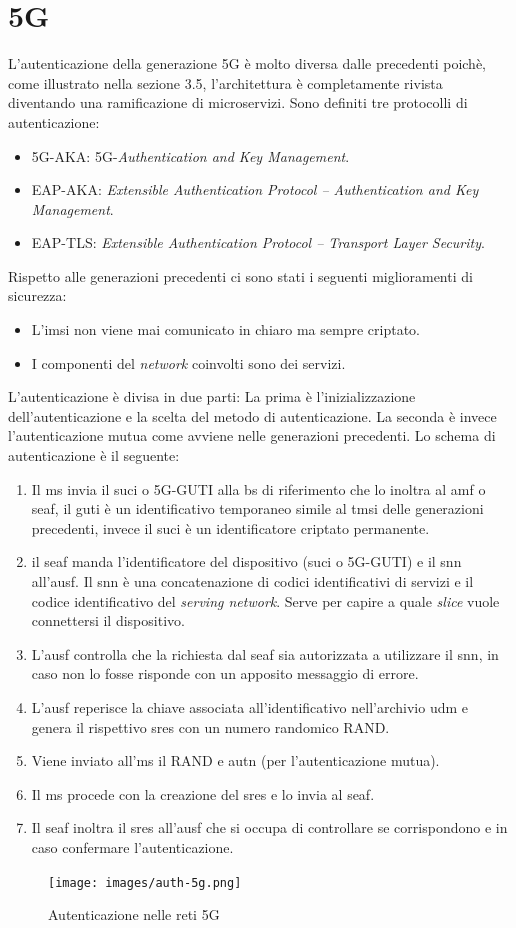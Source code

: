 \clearpage

\section{5G}
L'autenticazione della generazione 5G è molto diversa dalle precedenti poichè, come illustrato nella sezione 3.5, l'architettura è completamente rivista diventando una ramificazione di microservizi.
Sono definiti tre protocolli di autenticazione:
\begin{itemize}
    \item 5G-AKA: 5G-\textit{Authentication and Key Management}.
    \item EAP-AKA: \textit{Extensible Authentication Protocol – Authentication and Key Management}.
    \item EAP-TLS: \textit{Extensible Authentication Protocol – Transport Layer Security}.
\end{itemize}
Rispetto alle generazioni precedenti ci sono stati i seguenti miglioramenti di sicurezza\cite{5g-vs-4g}:
\begin{itemize}
    \item L'\gls{imsi} non viene mai comunicato in chiaro ma sempre criptato.
    \item I componenti del \textit{network} coinvolti sono dei servizi.
\end{itemize}
L'autenticazione è divisa in due parti: La prima è l'inizializzazione dell'autenticazione e la scelta del metodo di autenticazione.
La seconda è invece l'autenticazione mutua come avviene nelle generazioni precedenti.
Lo schema di autenticazione è il seguente\cite{5g-auth}:
\begin{enumerate}
    \item Il \gls{ms} invia il \gls{suci} o 5G-GUTI alla \gls{bs} di riferimento che lo inoltra al \gls{amf} o \gls{seaf},
    il \gls{guti} è un identificativo temporaneo simile al \gls{tmsi} delle generazioni precedenti, invece il \gls{suci} è un identificatore criptato
    permanente.
    \item il \gls{seaf} manda l'identificatore del dispositivo (\gls{suci} o 5G-GUTI) e il \gls{snn} all'\gls{ausf}.
    Il \gls{snn} è una concatenazione di codici identificativi di servizi e il codice identificativo del \textit{serving network}. Serve per capire 
    a quale \textit{slice} vuole connettersi il dispositivo.
    \item L'\gls{ausf} controlla che la richiesta dal \gls{seaf} sia autorizzata a utilizzare il \gls{snn}, in caso non lo fosse risponde con un 
    apposito messaggio di errore.
    \item L'\gls{ausf} reperisce la chiave associata all'identificativo nell'archivio \gls{udm} e genera il rispettivo \gls{sres} con un numero randomico RAND.
    \item Viene inviato all'\gls{ms} il RAND e \gls{autn} (per l'autenticazione mutua).
    \item Il \gls{ms} procede con la creazione del \gls{sres} e lo invia al \gls{seaf}.
    \item Il \gls{seaf} inoltra il \gls{sres} all'\gls{ausf} che si occupa di controllare se corrispondono e in caso confermare l'autenticazione.
\end{enumerate}
\begin{figure}[h]
    \centering
    \texttt{[image: images/auth-5g.png]}
    \caption{Autenticazione nelle reti 5G}
\end{figure}